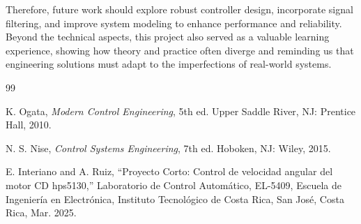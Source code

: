 \documentclass[conference]{IEEEtran}
\begin{document}
Therefore, future work should explore robust controller design, incorporate signal filtering, and improve system modeling to enhance performance and reliability. Beyond the technical aspects, this project also served as a valuable learning experience, showing how theory and practice often diverge and reminding us that engineering solutions must adapt to the imperfections of real-world systems.

\begin{thebibliography}{99}

K. Ogata, \textit{Modern Control Engineering}, 5th ed.
Upper Saddle River, NJ: Prentice Hall, 2010.

N. S. Nise, \textit{Control Systems Engineering}, 7th ed.
Hoboken, NJ: Wiley, 2015.

E. Interiano and A. Ruiz, ``Proyecto Corto: Control de velocidad
angular del motor CD hps5130,'' Laboratorio de Control Automático,
EL-5409, Escuela de Ingeniería en Electrónica, Instituto Tecnológico
de Costa Rica, San José, Costa Rica, Mar. 2025.

\end{thebibliography}
\end{document}
